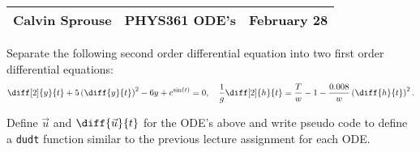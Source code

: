 \documentclass[a4paper, 12pt]{config/homework}
\begin{document}
\noindent
\begin{tabularx}{\textwidth}{>{\centering\arraybackslash}X>{\centering\arraybackslash}X>{\centering\arraybackslash}X}
Calvin Sprouse & PHYS361 ODE's & 2024 February 28\\
\midrule
\end{tabularx}

\vspace{\baselineskip}\noindent
Separate the following second order differential equation into two first order differential equations:
\[\diff[2]{y}{t} + 5\left(\diff{y}{t}\right)^2 - 6y + e^{\sin(t)} = 0, \quad
\frac{1}{g}\diff[2]{h}{t} = \frac{T}{w} - 1 - \frac{0.008}{w}\left(\diff{h}{t}\right)^2.\]

\vspace{\baselineskip}\noindent
Define \(\vec{u}\) and \(\diff{\vec{u}}{t}\) for the ODE's above and write pseudo code to define a \texttt{dudt} function similar to the previous lecture assignment for each ODE.
\end{document}
